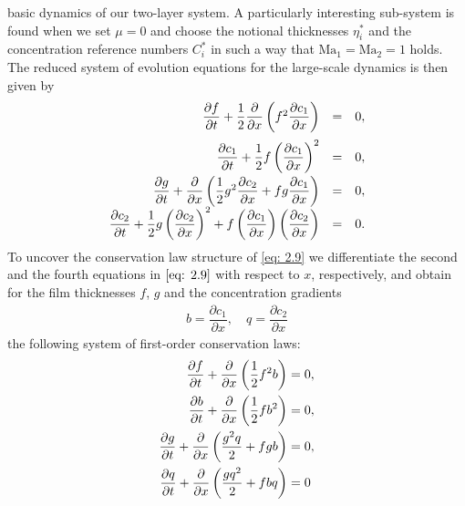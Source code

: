 \documentclass[11pt]{article}
\numberwithin{equation}{section}
\newtheorem{counter example}[theorem]{Counter Example}
\begin{document}
{basic dynamics of our two-layer system. 
A particularly interesting  sub-system is found when we set  $\mu =0$ and  choose the notional thicknesses  $\eta_i^*$ and the concentration reference numbers  $C_i^*$ in such a way that $\mathrm{Ma_1}= \mathrm{Ma_2}=1$
holds.  The reduced system of  evolution equations for the large-scale dynamics is then given by
\begin{equation}
\begin{array}{rcl}
\label{eq: 2.9}
\dfrac{\partial f}{\partial t}+\dfrac{1}{2}\dfrac{\partial}{\partial x}\left(f^2\dfrac{\partial c_1}{\partial x}\right)&=&0,\vspace{0.2 cm}\\[0.4em]
\dfrac{\partial c_1}{\partial t}+\dfrac{1}{2}f\left(\dfrac{\partial c_1}{\partial x}\right)^2&=&0,\\[1.9ex]
\dfrac{\partial g}{\partial t}+\dfrac{\partial}{\partial x}\left(\dfrac{1}{2}g^2\dfrac{\partial c_2}{\partial x}+fg\dfrac{\partial c_1}{\partial x}\right)&=&0,\\[0.4em]
\dfrac{\partial c_2}{\partial t}+\dfrac{1}{2}g\left(\dfrac{\partial c_2}{\partial x}\right)^2+f\left(\dfrac{\partial c_1}{\partial x}\right)\left(\dfrac{\partial c_2}{\partial x}\right)&=&0.
\end{array}
\end{equation}
To uncover the conservation law structure of \eqref{eq: 2.9} we differentiate the second and the fourth equations in $\eqref{eq: 2.9}$ with respect to $x$, respectively, and  obtain
for the film thicknesses $f$, $g$ and  the concentration gradients 
\begin{align*}
b=\dfrac{\partial c_1}{\partial x}, \quad %
q=\dfrac{\partial c_2}{\partial x}
\end{align*}
the following system of  first-order conservation laws: 
\begin{align}\label{eq: Main_system}
    \dfrac{\partial f}{\partial t}+\dfrac{\partial}{\partial x}\left(\dfrac{1}{2}f^2b\right)&=0,\vspace{0.2 cm} \nonumber\\
    \dfrac{\partial b}{\partial t}+\dfrac{\partial}{\partial x}\left(\dfrac{1}{2}fb^2\right)&=0,\vspace{0.2 cm} \\
     \dfrac{\partial g}{\partial t}+\dfrac{\partial}{\partial x}\left(\dfrac{g^2q}{2}+fgb\right)&=0,\vspace{0.2 cm} \nonumber\\
  \dfrac{\partial q}{\partial t}+\dfrac{\partial}{\partial x}\left(\dfrac{gq^2}{2}+fbq\right)&=0\nonumber
\end{align}

}
\end{document}
